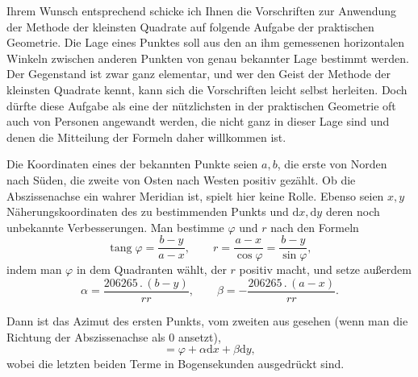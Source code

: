 Ihrem Wunsch entsprechend schicke ich Ihnen die Vorschriften zur Anwendung der Methode der kleinsten Quadrate auf folgende Aufgabe der praktischen Geometrie. Die Lage eines Punktes soll aus den an ihm gemessenen horizontalen Winkeln zwischen anderen Punkten von genau bekannter Lage bestimmt werden. Der Gegenstand ist zwar ganz elementar, und wer den Geist der Methode der kleinsten Quadrate kennt, kann sich die Vorschriften leicht selbst herleiten. Doch dürfte diese Aufgabe als eine der nützlichsten in der praktischen Geometrie oft auch von Personen angewandt werden, die nicht ganz in dieser Lage sind und denen die Mitteilung der Formeln daher willkommen ist.

Die Koordinaten eines der bekannten Punkte seien \(a,b\), die erste von Norden nach Süden, die zweite von Osten nach Westen positiv gezählt. Ob die Abszissenachse ein wahrer Meridian ist, spielt hier keine Rolle. Ebenso seien \(x,y\) Näherungskoordinaten des zu bestimmenden Punkts und \(\mathrm{d}x,\mathrm{d}y\) deren noch unbekannte Verbesserungen. Man bestimme \(\varphi\) und \(r\) nach den Formeln
\[
 \operatorname{tang}\varphi=\frac{b-y}{a-x},\qquad
 r=\frac{a-x}{\cos\varphi}=\frac{b-y}{\sin\varphi},
\]
\noindent indem man \(\varphi\) in dem Quadranten wählt, der \(r\) positiv macht, und setze außerdem
\[
 \alpha=\frac{206265\,.\,(b-y)}{rr},\qquad
 \beta=-\frac{206265\,.\,(a-x)}{rr}.
\]

Dann ist das Azimut des ersten Punkts, vom zweiten aus gesehen (wenn man die Richtung der Abszissenachse als \(0\) ansetzt),
\[
 =\varphi+\alpha\mathrm{d}x+\beta\mathrm{d}y,
\]
\noindent wobei die letzten beiden Terme in Bogensekunden ausgedrückt sind.
